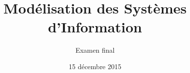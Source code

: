\title{
   Modélisation des Systèmes d'Information
}
\author{
	Examen final
}
\date{15 décembre 2015}
